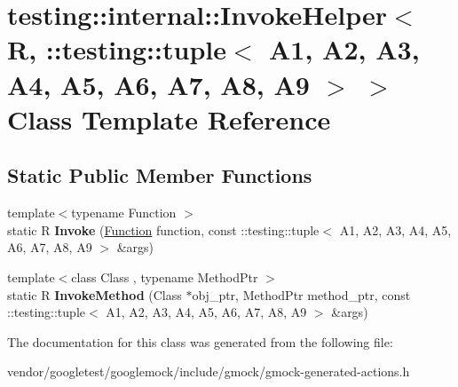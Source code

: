 \hypertarget{classtesting_1_1internal_1_1_invoke_helper_3_01_r_00_01_1_1testing_1_1tuple_3_01_a1_00_01_a2_00_cb3e0694d0722fcc616ae618dc383e5b}{}\section{testing\+:\+:internal\+:\+:Invoke\+Helper$<$ R, \+:\+:testing\+:\+:tuple$<$ A1, A2, A3, A4, A5, A6, A7, A8, A9 $>$ $>$ Class Template Reference}
\label{classtesting_1_1internal_1_1_invoke_helper_3_01_r_00_01_1_1testing_1_1tuple_3_01_a1_00_01_a2_00_cb3e0694d0722fcc616ae618dc383e5b}
\subsection*{Static Public Member Functions}
\begin{DoxyCompactItemize}
\item 
\mbox{\label{classtesting_1_1internal_1_1_invoke_helper_3_01_r_00_01_1_1testing_1_1tuple_3_01_a1_00_01_a2_00_cb3e0694d0722fcc616ae618dc383e5b_afd0d2a5a81d947b5b11dc2ede6e49a0e}} 
{\footnotesize template$<$typename Function $>$ }\\static R {\bfseries Invoke} (\hyperlink{structtesting_1_1internal_1_1_function}{Function} function, const \+::testing\+::tuple$<$ A1, A2, A3, A4, A5, A6, A7, A8, A9 $>$ \&args)
\item 
\mbox{\label{classtesting_1_1internal_1_1_invoke_helper_3_01_r_00_01_1_1testing_1_1tuple_3_01_a1_00_01_a2_00_cb3e0694d0722fcc616ae618dc383e5b_ab468cf4a3e1ff2fa33a60ce3459c17f7}} 
{\footnotesize template$<$class Class , typename Method\+Ptr $>$ }\\static R {\bfseries Invoke\+Method} (Class $\ast$obj\+\_\+ptr, Method\+Ptr method\+\_\+ptr, const \+::testing\+::tuple$<$ A1, A2, A3, A4, A5, A6, A7, A8, A9 $>$ \&args)
\end{DoxyCompactItemize}


The documentation for this class was generated from the following file\+:\begin{DoxyCompactItemize}
\item 
vendor/googletest/googlemock/include/gmock/gmock-\/generated-\/actions.\+h\end{DoxyCompactItemize}
